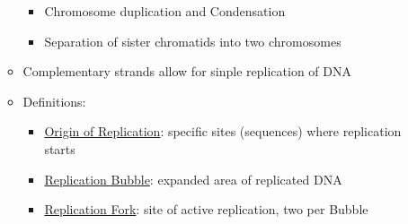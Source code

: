 \documentclass[12pt]{article}
\begin{document}
\begin{itemize}
\begin{itemize}
\begin{itemize}
                \item Chromosome duplication and Condensation
                \item Separation of sister chromatids into two chromosomes
            \end{itemize}
            \item Complementary strands allow for sinple replication of DNA
            \item Definitions:
            \begin{itemize}
                \item \underline{Origin of Replication}: specific sites (sequences) where replication starts
                \item \underline{Replication Bubble}: expanded area of replicated DNA
                \item \underline{Replication Fork}: site of active replication, two per Bubble
            \end{itemize}
        \end{itemize}
    \end{itemize}
\end{document}
